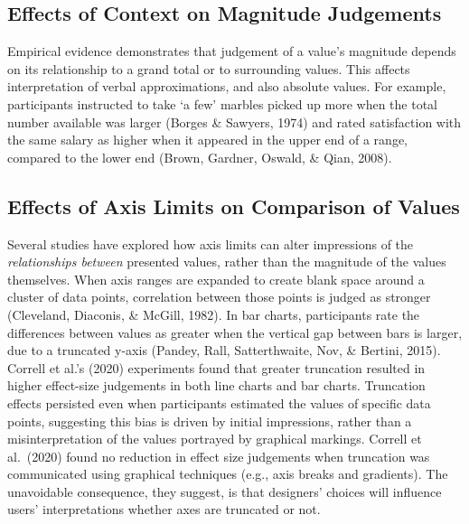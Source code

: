 \documentclass[journal]{vgtc}                %
\begin{document}
\hypertarget{effects-of-context-on-magnitude-judgements}{%
\subsection{Effects of Context on Magnitude Judgements}\label{effects-of-context-on-magnitude-judgements}}

Empirical evidence demonstrates that judgement of a value's magnitude depends on its relationship to a grand total or to surrounding values. This affects interpretation of verbal approximations, and also absolute values. For example, participants instructed to take `a few' marbles picked up more when the total number available was larger (Borges \& Sawyers, 1974) and rated satisfaction with the same salary as higher when it appeared in the upper end of a range, compared to the lower end (Brown, Gardner, Oswald, \& Qian, 2008).~

\hypertarget{effects-of-axis-limits-on-comparison-of-values}{%
\subsection{Effects of Axis Limits on Comparison of Values}\label{effects-of-axis-limits-on-comparison-of-values}}

Several studies have explored how axis limits can alter impressions of the \emph{relationships between} presented values, rather than the magnitude of the values themselves. When axis ranges are expanded to create blank space around a cluster of data points, correlation between those points is judged as stronger (Cleveland, Diaconis, \& McGill, 1982). In bar charts, participants rate the differences between values as greater when the vertical gap between bars is larger, due to a truncated y-axis (Pandey, Rall, Satterthwaite, Nov, \& Bertini, 2015). Correll et al.'s (2020) experiments found that greater truncation resulted in higher effect-size judgements in both line charts and bar charts. Truncation effects persisted even when participants estimated the values of specific data points, suggesting this bias is driven by initial impressions, rather than a misinterpretation of the values portrayed by graphical markings. Correll et al.~(2020) found no reduction in effect size judgements when truncation was communicated using graphical techniques (e.g., axis breaks and gradients). The unavoidable consequence, they suggest, is that designers' choices will influence users' interpretations whether axes are truncated or not.
\end{document}
